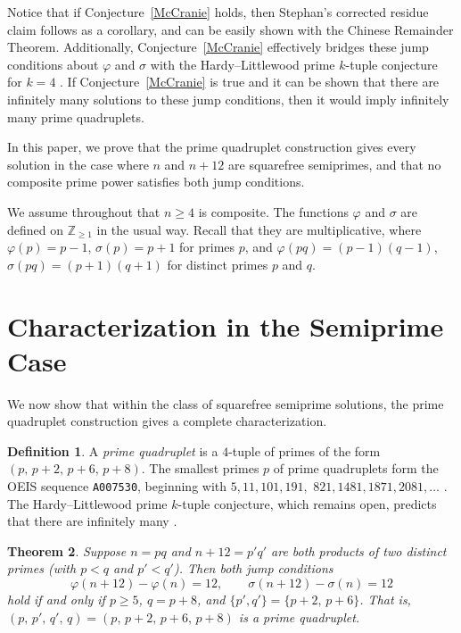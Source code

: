 \documentclass[12pt, twoside]{amsart}
\newtheorem{theorem}{Theorem}[section]
\theoremstyle{definition}
\newtheorem{definition}[theorem]{Definition}
\begin{document}
Notice that if Conjecture~\ref{McCranie} holds, then Stephan's corrected residue claim follows as a corollary, and can be easily shown with the Chinese Remainder Theorem. Additionally, Conjecture~\ref{McCranie} effectively bridges these jump conditions about $\varphi$ and $\sigma$ with the Hardy--Littlewood prime $k$-tuple conjecture for $k=4$ \cite{HardyLittlewood}. If Conjecture~\ref{McCranie} is true and it can be shown that there are infinitely many solutions to these jump conditions, then it would imply infinitely many prime quadruplets.

In this paper, we prove that the prime quadruplet construction gives every solution in the case where $n$ and $n+12$ are squarefree semiprimes, and that no composite prime power satisfies both jump conditions.

We assume throughout that $n \ge 4$ is composite. The functions $\varphi$ and $\sigma$ are defined on $\mathbb{Z}_{\ge 1}$ in the usual way. Recall that they are multiplicative, where $\varphi(p) = p-1$, $\sigma(p) = p+1$ for primes $p$, and $\varphi(pq) = (p-1)(q-1)$, $\sigma(pq) = (p+1)(q+1)$ for distinct primes $p$ and $q$.

\section{Characterization in the Semiprime Case}\label{sec:semiprime-char}

We now show that within the class of squarefree semiprime solutions, the prime quadruplet construction gives a complete characterization.

\begin{definition}
A \emph{prime quadruplet} is a $4$-tuple of primes of the form $(p,\, p+2,\, p+6,\, p+8)$. The smallest primes $p$ of prime quadruplets form the OEIS sequence \texttt{A007530}, beginning with $5, 11, 101, 191,$ $ 821, 1481, 1871, 2081, \ldots$ \cite{OEIS-A007530}. The Hardy--Littlewood prime $k$-tuple conjecture, which remains open, predicts that there are infinitely many \cite{HardyLittlewood}.
\end{definition}

\begin{theorem}\label{thm:semiprime-char}
Suppose $n = pq$ and $n+12 = p'q'$ are both products of two distinct primes (with $p < q$ and $p' < q'$). Then both jump conditions
\[
\varphi(n+12) - \varphi(n) = 12, \qquad \sigma(n+12) - \sigma(n) = 12
\]
hold if and only if $p \ge 5$, $q = p+8$, and $\{p', q'\} = \{p+2,\, p+6\}$. That is, $(p,\, p',\, q',\, q) = (p,\, p+2,\, p+6,\, p+8)$ is a prime quadruplet.\end{theorem}
\end{document}
